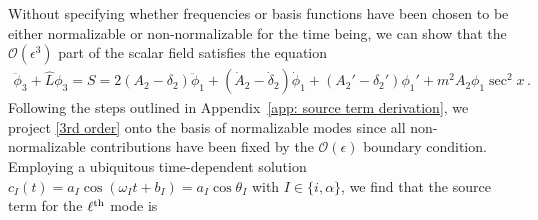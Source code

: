 \documentclass[letterpaper,11pt]{article}
\newcommand{\mc}{\mathcal}
\begin{document}
Without specifying whether frequencies or basis functions have been chosen to be either normalizable or non-normalizable for the time being, we can show that the $\mc O(\epsilon^3)$ part of the scalar field satisfies the equation
\begin{align}
\label{3rd order}
\ddot \phi_3 + \hat L \phi_3 = S = 2 (A_2 - \delta_2) \ddot \phi_1 + (\dot A_2 - \dot \delta_2) \dot\phi_1 + (A_2' -\delta_2' )\phi_1' + m^2 A_2 \phi_1 \sec^2 x \, .
\end{align}
Following the steps outlined in Appendix~\ref{app: source term derivation}, we project \eqref{3rd order} onto the basis of normalizable modes since all non-normalizable contributions have been fixed by the $\mc O(\epsilon)$ boundary condition. Employing a ubiquitous time-dependent solution ${c_I(t) = a_I \cos (\omega_I t + b_I) = a_I \cos\theta_I}$ with $I \in \{i, \alpha \}$, we find that the source term for the $\ell^{\rm th}$ mode is
\end{document}
